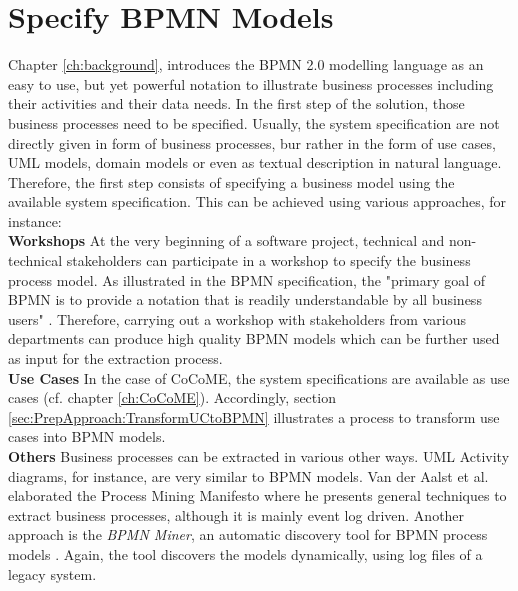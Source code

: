 \section{Specify BPMN Models}
\label{sec:Solution:SpecifyBPMN}
Chapter \ref{ch:background}, introduces the BPMN 2.0 modelling language as an easy to use, but yet powerful notation to illustrate business processes including their activities and their data needs.
In the first step of the solution, those business processes need to be specified. Usually, the system specification are not directly given in form of business processes, bur rather in the form of use cases, UML models, domain models or even as textual description in natural language. Therefore, the first step consists of specifying a business model using the available system specification. This can be achieved using various approaches, for instance: \\





\noindent
\textbf{Workshops} At the very beginning of a software project, technical and non-technical stakeholders can participate in a workshop to specify the business process model. As illustrated in the BPMN specification, the "primary goal of BPMN is to provide a notation that is readily understandable by all business users"  \cite{OMG}. Therefore, carrying out a workshop with stakeholders from various departments can produce high quality BPMN models which can be further used as input for the extraction process.\\
\textbf{Use Cases} In the case of CoCoME, the system specifications are available as use cases (cf. chapter \ref{ch:CoCoME}). 
Accordingly, section \ref{sec:PrepApproach:TransformUCtoBPMN} illustrates a process to transform use cases into BPMN models.  \\
\textbf{Others} Business processes can be extracted in various other ways. UML Activity diagrams, for instance, are very similar to BPMN models. Van der Aalst et al. elaborated the Process Mining Manifesto \cite{ProcessMiningManifesto} where he presents general techniques to extract business processes, although it is mainly event log driven. Another approach is the \textit{BPMN Miner}, an automatic discovery tool for BPMN process models \cite{BPMNMiner}. Again, the tool discovers the models dynamically, using log files of a legacy system.





